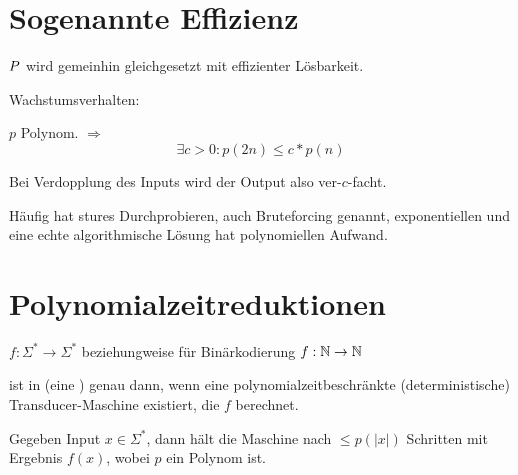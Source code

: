 \section{Sogenannte Effizienz}


$P$ wird gemeinhin gleichgesetzt mit effizienter Lösbarkeit.
    
Wachstumsverhalten:

  $p$ Polynom. $\Rightarrow$ 
  $$ \exists c > 0:   p(2n) \leq c * p(n) $$

  Bei Verdopplung des Inputs wird der Output also ver-$c$-facht.

  Häufig hat stures Durchprobieren, auch Bruteforcing genannt,
  exponentiellen und eine echte algorithmische Lösung hat polynomiellen Aufwand.













\section{Polynomialzeitreduktionen}



\begin{definition}

    $f : \Sigma^\ast \rightarrow \Sigma^\ast $
    beziehungweise für Binärkodierung
    $f : \mathbb{N} \rightarrow \mathbb{N} $

    ist in  (eine ) genau dann, wenn eine polynomialzeitbeschränkte (deterministische) Transducer-Maschine existiert, die $f$ berechnet.

\end{definition}


Gegeben Input $x \in \Sigma^\ast$, dann hält die Maschine nach $\leq p(|x|)$ Schritten mit Ergebnis $f(x)$, wobei $p$ ein Polynom ist.


